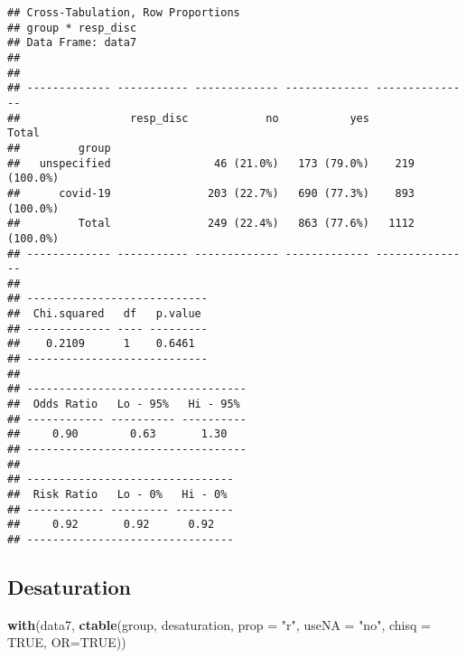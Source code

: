 \documentclass[
]{article}
\newenvironment{Shaded}{\begin{snugshade}}{\end{snugshade}}
\newcommand{\DataTypeTok}[1]{\textcolor[rgb]{0.13,0.29,0.53}{#1}}
\newcommand{\KeywordTok}[1]{\textcolor[rgb]{0.13,0.29,0.53}{\textbf{#1}}}
\newcommand{\NormalTok}[1]{#1}
\newcommand{\OtherTok}[1]{\textcolor[rgb]{0.56,0.35,0.01}{#1}}
\newcommand{\StringTok}[1]{\textcolor[rgb]{0.31,0.60,0.02}{#1}}
\begin{document}
\begin{verbatim}
## Cross-Tabulation, Row Proportions  
## group * resp_disc  
## Data Frame: data7  
## 
## 
## ------------- ----------- ------------- ------------- ---------------
##                 resp_disc            no           yes           Total
##         group                                                        
##   unspecified                46 (21.0%)   173 (79.0%)    219 (100.0%)
##      covid-19               203 (22.7%)   690 (77.3%)    893 (100.0%)
##         Total               249 (22.4%)   863 (77.6%)   1112 (100.0%)
## ------------- ----------- ------------- ------------- ---------------
## 
## ----------------------------
##  Chi.squared   df   p.value 
## ------------- ---- ---------
##    0.2109      1    0.6461  
## ----------------------------
## 
## ----------------------------------
##  Odds Ratio   Lo - 95%   Hi - 95% 
## ------------ ---------- ----------
##     0.90        0.63       1.30   
## ----------------------------------
## 
## --------------------------------
##  Risk Ratio   Lo - 0%   Hi - 0% 
## ------------ --------- ---------
##     0.92       0.92      0.92   
## --------------------------------
\end{verbatim}

\hypertarget{desaturation}{%
\subsection{Desaturation}\label{desaturation}}

\begin{Shaded}
\begin{Highlighting}[]
\KeywordTok{with}\NormalTok{(data7, }\KeywordTok{ctable}\NormalTok{(group, desaturation, }\DataTypeTok{prop =} \StringTok{"r"}\NormalTok{, }\DataTypeTok{useNA =} \StringTok{"no"}\NormalTok{, }\DataTypeTok{chisq =} \OtherTok{TRUE}\NormalTok{, }\DataTypeTok{OR=}\OtherTok{TRUE}\NormalTok{))}
\end{Highlighting}
\end{Shaded}
\end{document}
